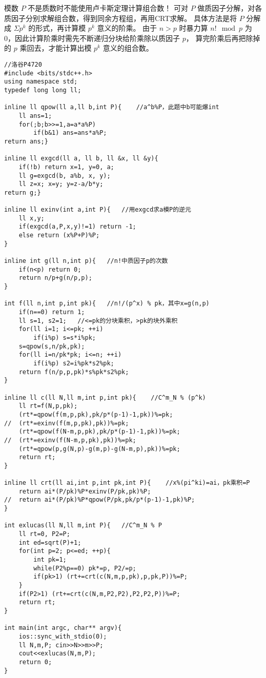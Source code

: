 模数 $P$ 不是质数时不能使用卢卡斯定理计算组合数！
可对 $P$ 做质因子分解，对各质因子分别求解组合数，得到同余方程组，再用CRT求解。
具体方法是将 $P$ 分解成 $\Sigma p^k$ 的形式，再计算模 $p^k$ 意义的阶乘。 
由于 $n > p$ 时暴力算 $n! \mod p$ 为0，因此计算阶乘时需先不断递归分块给阶乘除以质因子 $p$，
算完阶乘后再把除掉的 $p$ 乘回去，才能计算出模 $p^k$ 意义的组合数。 

\begin{lstlisting}
//洛谷P4720
#include <bits/stdc++.h>
using namespace std;
typedef long long ll;

inline ll qpow(ll a,ll b,int P){	//a^b%P，此题中b可能爆int
	ll ans=1;
	for(;b;b>>=1,a=a*a%P)
		if(b&1) ans=ans*a%P;
return ans;}

inline ll exgcd(ll a, ll b, ll &x, ll &y){
	if(!b) return x=1, y=0, a;
	ll g=exgcd(b, a%b, x, y);
	ll z=x; x=y; y=z-a/b*y;
return g;}

inline ll exinv(int a,int P){	//用exgcd求a模P的逆元 
	ll x,y;
	if(exgcd(a,P,x,y)!=1) return -1;
	else return (x%P+P)%P;
}

inline int g(ll n,int p){	//n!中质因子p的次数
	if(n<p) return 0;
	return n/p+g(n/p,p);
}

int f(ll n,int p,int pk){	//n!/(p^x) % pk，其中x=g(n,p)
	if(n==0) return 1;
	ll s=1, s2=1;	//<=pk的分块乘积，>pk的块外乘积
	for(ll i=1; i<=pk; ++i)
		if(i%p) s=s*i%pk;
	s=qpow(s,n/pk,pk);
	for(ll i=n/pk*pk; i<=n; ++i)
		if(i%p) s2=i%pk*s2%pk; 
	return f(n/p,p,pk)*s%pk*s2%pk;
}

inline ll c(ll N,ll m,int p,int pk){	//C^m_N % (p^k)
	ll rt=f(N,p,pk);
	(rt*=qpow(f(m,p,pk),pk/p*(p-1)-1,pk))%=pk;
//	(rt*=exinv(f(m,p,pk),pk))%=pk;
	(rt*=qpow(f(N-m,p,pk),pk/p*(p-1)-1,pk))%=pk;
//	(rt*=exinv(f(N-m,p,pk),pk))%=pk;
	(rt*=qpow(p,g(N,p)-g(m,p)-g(N-m,p),pk))%=pk;
	return rt;
}

inline ll crt(ll ai,int p,int pk,int P){	//x%(pi^ki)=ai，pk乘积=P
	return ai*(P/pk)%P*exinv(P/pk,pk)%P;
//	return ai*(P/pk)%P*qpow(P/pk,pk/p*(p-1)-1,pk)%P;
}

int exlucas(ll N,ll m,int P){	//C^m_N % P
	ll rt=0, P2=P;
	int ed=sqrt(P)+1;
	for(int p=2; p<=ed; ++p){
		int pk=1;
		while(P2%p==0) pk*=p, P2/=p;
		if(pk>1) (rt+=crt(c(N,m,p,pk),p,pk,P))%=P;
	}
	if(P2>1) (rt+=crt(c(N,m,P2,P2),P2,P2,P))%=P;
	return rt;
}

int main(int argc, char** argv){
	ios::sync_with_stdio(0);
	ll N,m,P; cin>>N>>m>>P;
	cout<<exlucas(N,m,P);
	return 0;
}
\end{lstlisting}